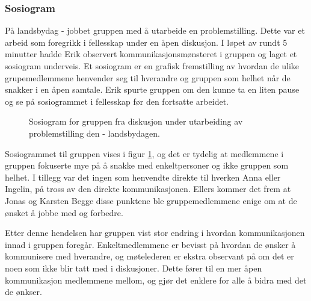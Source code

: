 \subsubsection{Sosiogram}
På landsbydag - jobbet gruppen med å utarbeide en problemstilling.
Dette var et arbeid som foregrikk i fellesskap under en åpen diskusjon.
I løpet av rundt 5 minutter hadde Erik observert kommunikasjonsmønsteret i gruppen og laget et sosiogram underveis.
Et sosiogram er en grafisk fremstilling av hvordan de ulike grupemedlemmene henvender seg til hverandre og gruppen som helhet når de snakker i en åpen samtale.
Erik spurte gruppen om den kunne ta en liten pause og se på sosiogrammet i fellesskap før den fortsatte arbeidet.

\begin{figure}
\label{fig:sosiogram}
\caption{Sosiogram for gruppen fra diskusjon under utarbeiding av problemstilling den - landsbydagen.}
\begin{center}
\end{center}
\end{figure}

Sosiogrammet til gruppen vises i figur \ref{fig:sosiogram}, og det er tydelig at medlemmene i gruppen fokuserte mye på å snakke med enkeltpersoner og ikke gruppen som helhet.
I tillegg var det ingen som henvendte direkte til hverken Anna eller Ingelin, på tross av den direkte kommunikasjonen.
Ellers kommer det frem at Jonas og Karsten 
Begge disse punktene ble gruppemedlemmene enige om at de ønsket å jobbe med og forbedre.

Etter denne hendelsen har gruppen vist stor endring i hvordan kommunikasjonen innad i gruppen foregår.
Enkeltmedlemmene er bevisst på hvordan de ønsker å kommunisere med hverandre, og møtelederen er ekstra observant på om det er noen som ikke blir tatt med i diskusjoner.
Dette fører til en mer åpen kommunikasjon medlemmene mellom, og gjør det enklere for alle å bidra med det de ønkser.